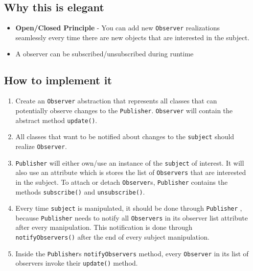 \subsection{Why this is
elegant}\label{behavioral-patterns.md__why-this-is-elegant-3}

\begin{itemize}
\tightlist
\item
  \textbf{Open/Closed Principle} - You can add new \texttt{Observer}
  realizations seamlessly every time there are new objects that are
  interested in the subject.
\item
  A observer can be subscribed/unsubscribed during runtime
\end{itemize}

\subsection{How to implement
it}\label{behavioral-patterns.md__how-to-implement-it-3}

\begin{enumerate}
\def\labelenumi{\arabic{enumi}.}
\tightlist
\item
  Create an \texttt{Observer} abstraction that represents all classes
  that can potentially observe changes to the \texttt{Publisher}.
  \texttt{Observer} will contain the abstract method \texttt{update()}.
\item
  All classes that want to be notified about changes to the
  \texttt{subject} should realize \texttt{Observer}.
\item
  \texttt{Publisher} will either own/use an instance of the
  \texttt{subject} of interest. It will also use an attribute which is
  stores the list of \texttt{Observers} that are interested in the
  subject. To attach or detach \texttt{Observer}s, \texttt{Publisher}
  contains the methods \texttt{subscribe()} and \texttt{unsubscribe()}.
\item
  Every time \texttt{subject} is manipulated, it should be done through
  \texttt{Publisher} , because \texttt{Publisher} needs to notify all
  \texttt{Observers} in its observer list attribute after every
  manipulation. This notification is done through
  \texttt{notifyObservers()} after the end of every subject
  manipulation.
\item
  Inside the \texttt{Publisher}s \texttt{notifyObservers} method, every
  \texttt{Observer} in its list of observers invoke their
  \texttt{update()} method.
\end{enumerate}

